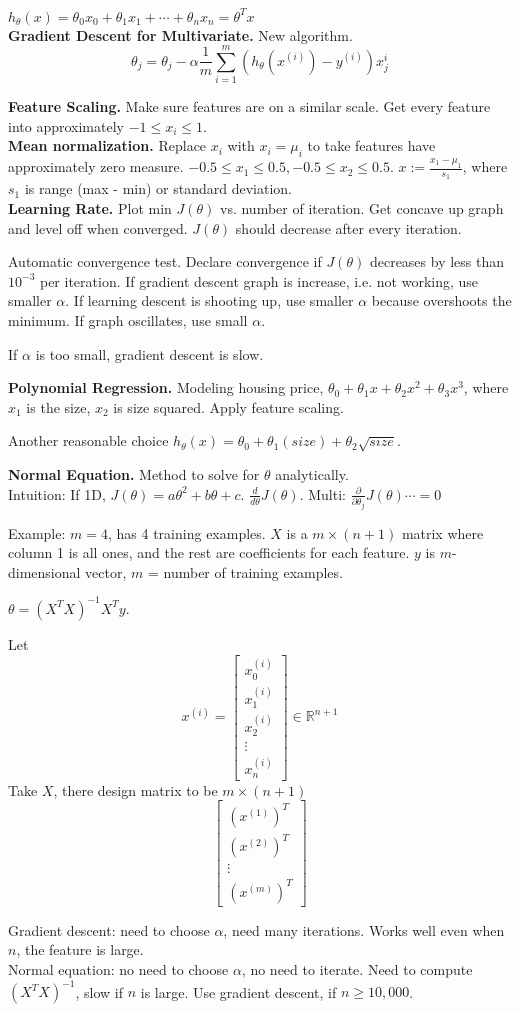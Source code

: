 \documentclass[a4 paper, 11 pt]{article}
\begin{document}
$h_\theta(x) = \theta_0 x_0 + \theta_1 x_1 + \cdots + \theta_n x_n = \theta^T x$ \\

\textbf{Gradient Descent for Multivariate.}
New algorithm.
\[
\theta_j = \theta_j - \alpha\frac{1}{m}\sum_{i=1}^m (h_\theta(x^{(i)}) - y^{(i)})x^{i}_j
\]

\textbf{Feature Scaling.} Make sure features are on a similar scale. Get every feature into approximately $-1 \le x_i \le 1$. \\
\textbf{Mean normalization.} Replace $x_i$ with $x_i = \mu_i$ to take features have approximately zero measure. $-0.5 \le x_1 \le 0.5, -0.5 \le x_2 \le 0.5$. $x:= \frac{x_1 - \mu_1}{s_1}$, where $s_1$ is range (max - min) or standard deviation. \\

\textbf{Learning Rate.} Plot min $J(\theta)$ vs. number of iteration. Get concave up graph and level off when converged. $J(\theta)$ should decrease after every iteration.

Automatic convergence test. Declare convergence if $J(\theta)$ decreases by less than $10^{-3}$ per iteration. If gradient descent graph is increase, i.e. not working, use smaller $\alpha$. If learning descent is shooting up, use smaller $\alpha$ because overshoots the minimum. If graph oscillates, use small $\alpha$.

If $\alpha$ is too small, gradient descent is slow.

\textbf{Polynomial Regression.} Modeling housing price, $\theta_0 + \theta_1x + \theta_2x^2 + \theta_3 x^3$, where $x_1$ is the size, $x_2$ is size squared. Apply feature scaling.

Another reasonable choice $h_\theta(x) = \theta_0 + \theta_1(size) + \theta_2\sqrt{size}$.

\textbf{Normal Equation.} Method to solve for $\theta$ analytically.\\
Intuition: If 1D, $J(\theta) = a\theta^2 + b\theta + c$. $\frac{d}{d\theta}J(\theta)$. Multi: $\frac{\partial}{\partial\theta_j}J(\theta) \cdots = 0$

Example: $m = 4$, has 4 training examples. $X$ is a $m \times (n+1)$ matrix where column 1 is all ones, and the rest are coefficients for each feature. $y$ is $m$-dimensional vector, $m$ = number of training examples.

$\theta = (X^TX)^{-1}X^Ty$.

Let
\[
x^{(i)} = \begin{bmatrix} x^{(i)}_0 \\ x^{(i)}_1 \\ x^{(i)}_2 \\ \vdots \\ x^{(i)}_n\end{bmatrix} \in \mathbb{R}^{n+1}
\]
Take $X$, there design matrix to be $m \times (n+1)$
\[
\begin{bmatrix} (x^{(1)})^T \\ (x^{(2)})^T \\ \vdots \\ (x^{(m)})^T\end{bmatrix}
\]

Gradient descent: need to choose $\alpha$, need many iterations. Works well even when $n$, the feature is large.\\
Normal equation: no need to choose $\alpha$, no need to iterate. Need to compute $(X^TX)^{-1}$, slow if $n$ is large. Use gradient descent, if $n \ge 10,000$.
\end{document}
